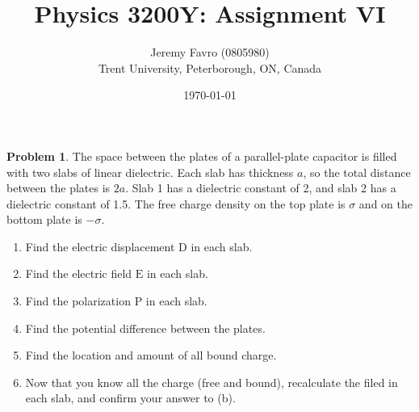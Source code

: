\documentclass[10pt]{article}
\title{Physics 3200Y: Assignment VI}
\author{Jeremy Favro (0805980) \\ Trent University, Peterborough, ON, Canada}
\date{\today}
\theoremstyle{definition}
\newtheorem{problem}{Problem}
\newcommand{\bv}[1]{\bm{\mathrm{#1}}}
\begin{document}
\maketitle

\begin{problem}
The space between the plates of a parallel-plate capacitor is filled
with two slabs of linear dielectric. Each slab has thickness $a$, so the total distance between the plates is $2a$.
Slab 1 has a dielectric constant of 2, and slab 2 has a dielectric constant of 1.5. The free charge density on the top plate
is $\sigma$ and on the bottom plate is $-\sigma$.
\begin{enumerate}[label=(\alph*)]
  \item Find the electric displacement $\bv{D}$ in each slab.
  \item Find the electric field $\bv{E}$ in each slab.
  \item Find the polarization $\bv{P}$ in each slab.
  \item Find the potential difference between the plates.
  \item Find the location and amount of all bound charge.
  \item Now that you know all the charge (free and bound), recalculate the filed in each slab, and confirm your answer to (b).
\end{enumerate}
\end{problem}
\end{document}
